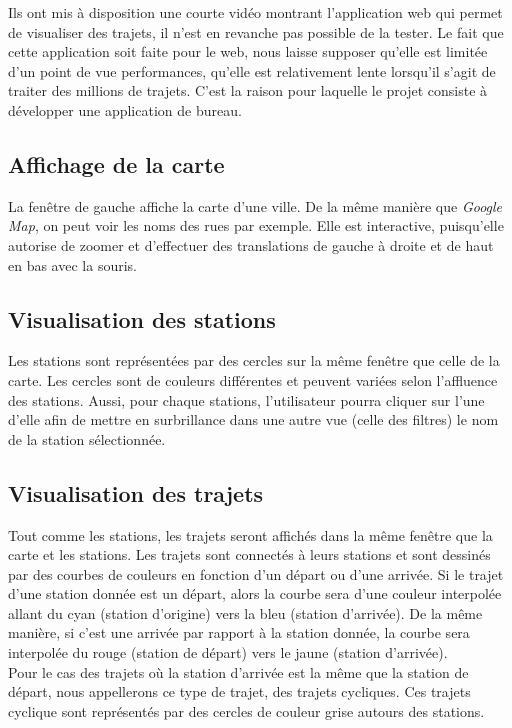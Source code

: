 \documentclass[12pt]{article}
\begin{document}
	Ils ont mis à disposition une courte vidéo montrant l'application web qui permet 
	de visualiser des trajets, il n'est en revanche pas possible de la tester. Le fait
	que cette application
	soit faite pour le web, nous laisse	supposer qu’elle est limitée d'un
	point de vue performances, qu’elle est relativement lente lorsqu’il s’agit
	de traiter des millions de trajets. C’est la raison pour laquelle 
	le projet consiste à développer une application de bureau.
	
		\subsection{Affichage de la carte} \label{interactions_et_affichages}
		La fenêtre de gauche affiche la carte d'une ville. De la même manière que
		\textit{Google Map}, on peut voir les noms des rues par exemple. Elle est interactive,
		puisqu'elle autorise de zoomer et d'effectuer des translations de gauche à droite et 
		de haut en bas avec la souris.
		
		\subsection{Visualisation des stations}
		Les stations sont représentées par des cercles sur la même fenêtre que celle de la carte.
		Les cercles sont de couleurs différentes et peuvent variées selon l'affluence des stations.
		Aussi, pour chaque stations, l'utilisateur pourra cliquer sur l'une d'elle afin de mettre
		en surbrillance dans une autre vue (celle des filtres) le nom de la station sélectionnée.
		
		\subsection{Visualisation des trajets}
		Tout comme les stations, les trajets seront affichés dans la même fenêtre que la carte et
		les stations. Les trajets sont connectés à leurs stations et sont dessinés par des courbes
		de couleurs en fonction d'un départ ou d'une arrivée. Si le trajet d'une station donnée est
		un départ, alors la courbe sera d'une couleur interpolée allant du cyan (station d'origine)
		vers la bleu (station d'arrivée). De la même manière, si c'est une arrivée par rapport à la
		station donnée, la courbe sera interpolée du rouge (station de départ) vers le jaune
		(station d'arrivée).\\
		Pour le cas des trajets où la station d'arrivée est la même que la station de départ, nous
		appellerons ce type de trajet, des trajets cycliques. Ces trajets cyclique sont représentés
		par des cercles de couleur grise autours des stations.
	
\end{document}

